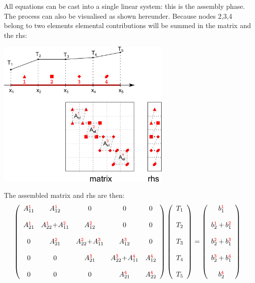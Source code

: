 All equations can be cast into a single linear system: this is the {\color{olive} assembly} phase.
The process can also be visualised as shown hereunder. Because nodes 2,3,4 belong to two elements 
elemental contributions will be summed in the matrix and the rhs:
\begin{center}
\includegraphics[width=8.5cm]{images/oneD/assembly}
\end{center}
The assembled matrix and rhs are then:
\[
\left(
\begin{array}{ccccc}
A_{11}^{{\color{red}\tt 1}} &  A_{12}^{{\color{red}\tt 1}} &0&0&0 \\ \\ 
A_{21}^{{\color{red}\tt 1}} &  A_{22}^{{\color{red} \tt 1}} \!+\! A_{11}^{{\color{red}\tt 2}}  & A_{12}^{{\color{red}\tt 2}}   &0&0 \\ \\
0& A_{21}^{{\color{red}\tt 2}} & A_{22}^{{\color{red} \tt 2}} \! +\! A_{11}^{{\color{red}\tt 3}}  & A_{12}^{{\color{red}\tt 3}}   & 0\\ \\
0&0& A_{21}^{{\color{red}\tt 3}}   & A_{22}^{{\color{red}\tt 3}} \! +\! A_{11}^{{\color{red}\tt 4}}   & A_{12}^{{\color{red}\tt 4}}  \\ \\
0&0&0& A_{21}^{{\color{red}\tt 4}}   & A_{22}^{{\color{red}\tt 4}} 
\end{array}
\right)
\left(
\begin{array}{c}
T_1 \\\\ T_2 \\\\ T_3 \\\\ T_4 \\\\ T_5
\end{array}
\right)
=
\left(
\begin{array}{c}
b_{1}^{{\color{red}\tt 1}} \\ \\
b_{2}^{{\color{red}\tt 1}} + b_{1}^{{\color{red}\tt 2}}\\ \\
b_{2}^{{\color{red}\tt 2}} + b_{1}^{{\color{red}\tt 3}}\\ \\
b_{2}^{{\color{red}\tt 3}} + b_{1}^{{\color{red}\tt 4}}\\ \\
b_{2}^{{\color{red}\tt 4}} 
\end{array}
\right)
\]
